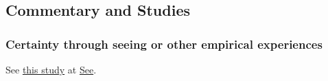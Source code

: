 	
		
	
	
	
	
\subsection{Commentary and Studies} %
	\label{CERTAINTY-COMMENTARY}

	
		
	\subsubsection{Certainty through seeing or other empirical experiences}
		
		See \hyperref[SEE-epistemic]{this study} at \hyperref[SEE]{See}.
